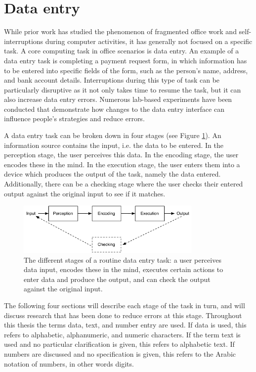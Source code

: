 \section{Data entry}
While prior work has studied the phenomenon of fragmented office work and self-interruptions during computer activities, it has generally not focused on a specific task. A core computing task in office scenarios is data entry. An example of a data entry task is completing a payment request form, in which information has to be entered into specific fields of the form, such as the person’s name, address, and bank account details. Interruptions
during this type of task can be particularly disruptive as it not only takes time to resume the task, but it can also increase data entry errors. Numerous lab-based experiments have been conducted that demonstrate how changes to the data entry interface can influence people’s strategies and reduce errors.

A data entry task can be broken down in four stages (see Figure \ref{fig:ch2_hip}). An information source contains the input, i.e. the data to be entered. In the perception stage, the user perceives this data. In the encoding stage, the user encodes these in the mind. In the execution stage, the user enters them into a device which produces the output of the task, namely the data entered. Additionally, there can be a checking stage where the user checks their entered output against the original input to see if it matches.

\begin{figure}[!ht]
\centering
\includegraphics[width=0.8\textwidth]{images/background/HIP.pdf}
\caption[Different stages of a data entry task]{The different stages of a routine data entry task: a user perceives data input, encodes these in the mind, executes certain actions to enter data and produce the output, and can check the output against the original input.}
\vspace{-3pt}
\label{fig:ch2_hip}
\end{figure}

The following four sections will describe each stage of the task in turn, and will discuss research that has been done to reduce errors at this stage. 
Throughout this thesis the terms data, text, and number entry are used. If data is used, this refers to alphabetic, alphanumeric, and numeric characters. 
If the term text is used and no particular clarification is given, this refers to alphabetic text. If numbers are discussed and no specification is given, this refers to the Arabic notation of numbers, in other words digits. 

